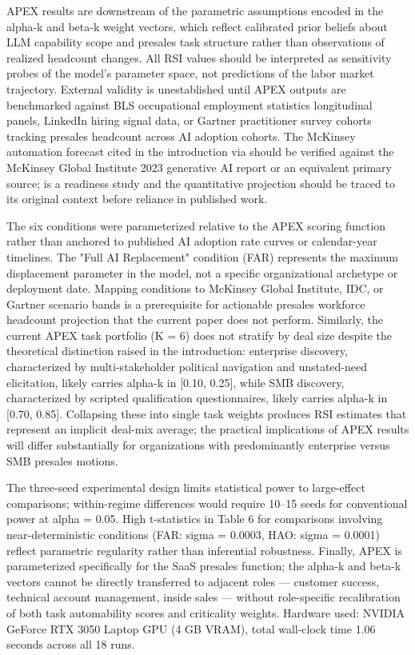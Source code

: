 \documentclass[10pt, conference]{IEEEtran}
\begin{document}
\label{sec:limitations}

APEX results are downstream of the parametric assumptions encoded in the alpha-k and beta-k weight vectors, which reflect calibrated prior beliefs about LLM capability scope and presales task structure rather than observations of realized headcount changes. All RSI values should be interpreted as sensitivity probes of the model's parameter space, not predictions of the labor market trajectory. External validity is unestablished until APEX outputs are benchmarked against BLS occupational employment statistics longitudinal panels, LinkedIn hiring signal data, or Gartner practitioner survey cohorts tracking presales headcount across AI adoption cohorts. The McKinsey automation forecast cited in the introduction via \cite{johnk2020ready} should be verified against the McKinsey Global Institute 2023 generative AI report or an equivalent primary source; \cite{johnk2020ready} is a readiness study and the quantitative projection should be traced to its original context before reliance in published work.

The six conditions were parameterized relative to the APEX scoring function rather than anchored to published AI adoption rate curves or calendar-year timelines. The "Full AI Replacement" condition (FAR) represents the maximum displacement parameter in the model, not a specific organizational archetype or deployment date. Mapping conditions to McKinsey Global Institute, IDC, or Gartner scenario bands is a prerequisite for actionable presales workforce headcount projection that the current paper does not perform. Similarly, the current APEX task portfolio (K = 6) does not stratify by deal size despite the theoretical distinction raised in the introduction: enterprise discovery, characterized by multi-stakeholder political navigation and unstated-need elicitation, likely carries alpha-k in [0.10, 0.25], while SMB discovery, characterized by scripted qualification questionnaires, likely carries alpha-k in [0.70, 0.85]. Collapsing these into single task weights produces RSI estimates that represent an implicit deal-mix average; the practical implications of APEX results will differ substantially for organizations with predominantly enterprise versus SMB presales motions.

The three-seed experimental design limits statistical power to large-effect comparisons; within-regime differences would require 10--15 seeds for conventional power at alpha = 0.05. High t-statistics in Table 6 for comparisons involving near-deterministic conditions (FAR: sigma = 0.0003, HAO: sigma = 0.0001) reflect parametric regularity rather than inferential robustness. Finally, APEX is parameterized specifically for the SaaS presales function; the alpha-k and beta-k vectors cannot be directly transferred to adjacent roles --- customer success, technical account management, inside sales --- without role-specific recalibration of both task automability scores and criticality weights. Hardware used: NVIDIA GeForce RTX 3050 Laptop GPU (4 GB VRAM), total wall-clock time 1.06 seconds across all 18 runs.
\end{document}
